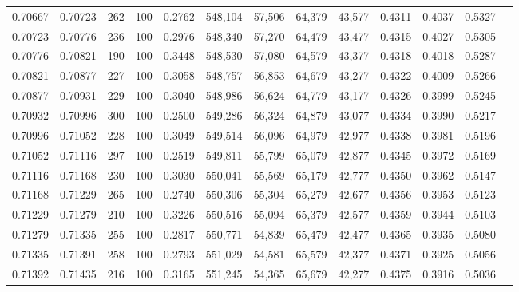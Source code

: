 \begin{tabular}{rrrrrrrrrrrrr}
0.70667 & 0.70723 &   262 & 100 &                                     0.2762 & 548,104 &  57,506 &  64,379 &  43,577 & 0.4311 & 0.4037 & 0.5327 \\
0.70723 & 0.70776 &   236 & 100 &                                     0.2976 & 548,340 &  57,270 &  64,479 &  43,477 & 0.4315 & 0.4027 & 0.5305 \\
0.70776 & 0.70821 &   190 & 100 &                                     0.3448 & 548,530 &  57,080 &  64,579 &  43,377 & 0.4318 & 0.4018 & 0.5287 \\
0.70821 & 0.70877 &   227 & 100 &                                     0.3058 & 548,757 &  56,853 &  64,679 &  43,277 & 0.4322 & 0.4009 & 0.5266 \\
0.70877 & 0.70931 &   229 & 100 &                                     0.3040 & 548,986 &  56,624 &  64,779 &  43,177 & 0.4326 & 0.3999 & 0.5245 \\
0.70932 & 0.70996 &   300 & 100 &                                     0.2500 & 549,286 &  56,324 &  64,879 &  43,077 & 0.4334 & 0.3990 & 0.5217 \\
0.70996 & 0.71052 &   228 & 100 &                                     0.3049 & 549,514 &  56,096 &  64,979 &  42,977 & 0.4338 & 0.3981 & 0.5196 \\
0.71052 & 0.71116 &   297 & 100 &                                     0.2519 & 549,811 &  55,799 &  65,079 &  42,877 & 0.4345 & 0.3972 & 0.5169 \\
0.71116 & 0.71168 &   230 & 100 &                                     0.3030 & 550,041 &  55,569 &  65,179 &  42,777 & 0.4350 & 0.3962 & 0.5147 \\
0.71168 & 0.71229 &   265 & 100 &                                     0.2740 & 550,306 &  55,304 &  65,279 &  42,677 & 0.4356 & 0.3953 & 0.5123 \\
0.71229 & 0.71279 &   210 & 100 &                                     0.3226 & 550,516 &  55,094 &  65,379 &  42,577 & 0.4359 & 0.3944 & 0.5103 \\
0.71279 & 0.71335 &   255 & 100 &                                     0.2817 & 550,771 &  54,839 &  65,479 &  42,477 & 0.4365 & 0.3935 & 0.5080 \\
0.71335 & 0.71391 &   258 & 100 &                                     0.2793 & 551,029 &  54,581 &  65,579 &  42,377 & 0.4371 & 0.3925 & 0.5056 \\
0.71392 & 0.71435 &   216 & 100 &                                     0.3165 & 551,245 &  54,365 &  65,679 &  42,277 & 0.4375 & 0.3916 & 0.5036 \\

\end{tabular}
